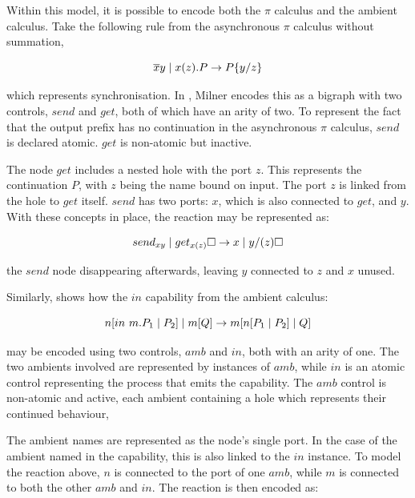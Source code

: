 Within this model, it is possible to encode both the $\pi$ calculus and
the ambient calculus.  Take the following rule from the asynchronous
$\pi$ calculus without summation,

\begin{equation}
\overline{x}y \;|\; x(z).P \rightarrow P\{y/z\}
\end{equation}

\noindent which represents synchronisation.  In \cite{bigraph1}, Milner
encodes this as a bigraph with two controls, $send$ and $get$, both of
which have an arity of two.  To represent the fact that the output
prefix has no continuation in the asynchronous $\pi$ calculus, $send$ is
declared atomic.  $get$ is non-atomic but inactive.

The node $get$ includes a nested hole with the port $z$.  This
represents the continuation $P$, with $z$ being the name bound on
input.  The port $z$ is linked from the hole to $get$ itself.  $send$
has two ports: $x$, which is also connected to $get$, and $y$.  With
these concepts in place, the reaction may be represented as:

\begin{equation}
send_{xy} \;|\; get_{x(z)} \square \rightarrow x \;|\; y/(z) \square
\end{equation}

\noindent the $send$ node disappearing afterwards, leaving $y$ connected
to $z$ and $x$ unused.

Similarly, \cite{bigraph1} shows how the $in$ capability from the
ambient calculus:

\begin{equation}
 n[in\ m.P_1 \;|\; P_2] \;|\; m[Q]
  \rightarrow
  m[n[P_1 \;|\; P_2] \;|\; Q] \\
\end{equation}

\noindent may be encoded using two controls, $amb$ and $in$, both with
an arity of one.  The two ambients involved are represented by
instances of $amb$, while $in$ is an atomic control representing the
process that emits the capability.  The $amb$ control is non-atomic
and active, each ambient containing a hole which represents their
continued behaviour,

The ambient names are represented as the node's single port.  In the
case of the ambient named in the capability, this is also linked to the
$in$ instance.  To model the reaction above, $n$ is connected to the
port of one $amb$, while $m$ is connected to both the other $amb$ and
$in$.  The reaction is then encoded as:

